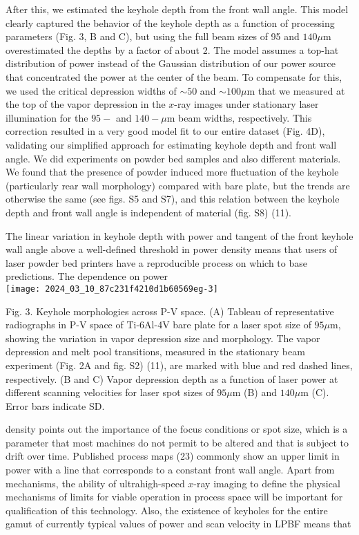 \documentclass[10pt]{article}
\begin{document}
After this, we estimated the keyhole depth from the front wall angle. This model clearly captured the behavior of the keyhole depth as a function of processing parameters (Fig. 3, B and C), but using the full beam sizes of 95 and $140 \mu \mathrm{m}$ overestimated the depths by a factor of about 2. The model assumes a top-hat distribution of power instead of the Gaussian distribution of our power source that concentrated the power at the center of the beam. To compensate for this, we used the critical depression widths of $\sim 50$ and $\sim 100 \mu \mathrm{m}$ that we measured at the top of the vapor depression in the $x$-ray images under stationary laser illumination for the $95-$ and $140-\mu \mathrm{m}$ beam widths, respectively. This correction resulted in a very good model fit to our entire dataset (Fig. 4D), validating our simplified approach for estimating keyhole depth and front wall angle. We did experiments on powder bed samples and also different materials. We found that the presence of powder induced more fluctuation of the keyhole (particularly rear wall morphology) compared with bare plate, but the trends are otherwise the same (see figs. S5 and S7), and this relation between the keyhole depth and front wall angle is independent of material (fig. S8) (11).

The linear variation in keyhole depth with power and tangent of the front keyhole wall angle above a well-defined threshold in power density means that users of laser powder bed printers have a reproducible process on which to base predictions. The dependence on power\\
\texttt{[image: 2024\_03\_10\_87c231f4210d1b60569eg-3]}

Fig. 3. Keyhole morphologies across P-V space. (A) Tableau of representative radiographs in P-V space of Ti-6Al-4V bare plate for a laser spot size of $95 \mu \mathrm{m}$, showing the variation in vapor depression size and morphology. The vapor depression and melt pool transitions, measured in the stationary beam experiment (Fig. 2A and fig. S2) (11), are marked with blue and red dashed lines, respectively. (B and C) Vapor depression depth as a function of laser power at different scanning velocities for laser spot sizes of $95 \mu \mathrm{m}$ (B) and $140 \mu \mathrm{m}$ (C). Error bars indicate SD.

density points out the importance of the focus conditions or spot size, which is a parameter that most machines do not permit to be altered and that is subject to drift over time. Published process maps (23) commonly show an upper limit in power with a line that corresponds to a constant front wall angle. Apart from mechanisms, the ability of ultrahigh-speed $x$-ray imaging to define the physical mechanisms of limits for viable operation in process space will be important for qualification of this technology. Also, the existence of keyholes for the entire gamut of currently typical values of power and scan velocity in LPBF means that
\end{document}
